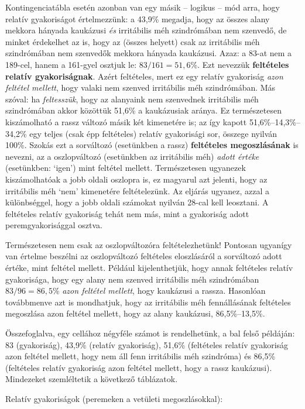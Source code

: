 \documentclass[
]{book}
\begin{document}
Kontingenciatábla esetén azonban van egy másik -- logikus -- mód arra, hogy relatív gyakoriságot értelmezzünk: a 43,9\% megadja, hogy az összes alany mekkora hányada kaukázusi \emph{és} irritábilis méh szindrómában nem szenvedő, de minket érdekelhet az is, hogy az (összes helyett) csak az irritábilis méh szindrómában nem szenvedők mekkora hányada kaukázusi. Azaz: a 83-at nem a 189-cel, hanem a 161-gyel osztjuk le: \(83/161=51,\!6\)\%. Ezt nevezzük \textbf{feltételes relatív gyakoriságnak}. Azért feltételes, mert ez egy relatív gyakoriság \emph{azon feltétel mellett}, hogy valaki nem szenved irritábilis méh szindrómában. Más szóval: ha \emph{feltesszük}, hogy az alanyaink nem szenvednek irritábilis méh szindrómában akkor közöttük 51,6\% a kaukázusiak aránya. Ez természetesen kiszámolható a rassz változó másik két kimenetére is; az így kapott 51,6\%--14,3\%--34,2\% egy teljes (csak épp feltételes) relatív gyakorisági sor, összege nyilván 100\%. Szokás ezt a sorváltozó (esetünkben a rassz) \textbf{feltételes megoszlásának} is nevezni, az a oszlopváltozó (esetünkben az irritábilis méh) \emph{adott értéke} (esetünkben: `igen') mint feltétel mellett. Természetesen ugyanezek kiszámolhatóak a jobb oldali oszlopra is, ez magyarul azt jelenti, hogy az irritábilis méh `nem' kimenetére feltételezünk. Az eljárás ugyanez, azzal a különbséggel, hogy a jobb oldali számokat nyilván 28-cal kell leosztani. A feltételes relatív gyakoriság tehát nem más, mint a gyakoriság adott peremgyakorisággal osztva.

Természetesen nem csak az oszlopváltozóra feltételezhetünk! Pontosan ugyanígy van értelme beszélni az oszlopváltozó feltételes eloszlásáról a sorváltozó adott értéke, mint feltétel mellett. Például kijelenthetjük, hogy annak feltételes relatív gyakorisága, hogy egy alany nem szenved irritábilis méh szindrómában \(83/96=86,\!5\)\% \emph{azon feltétel mellett}, hogy kaukázusi a rassza. Hasonlóan továbbmenve azt is mondhatjuk, hogy az irritábilis méh fennállásának feltételes megoszlása azon feltétel mellett, hogy az alany kaukázusi, 86,5\%--13,5\%.

Összefoglalva, egy cellához négyféle számot is rendelhetünk, a bal felső példáján: 83 (gyakoriság), 43,9\% (relatív gyakoriság), 51,6\% (feltételes relatív gyakoriság azon feltétel mellett, hogy nem áll fenn irritábilis méh szindróma) és 86,5\% (feltételes relatív gyakoriság azon feltétel mellett, hogy a rassz kaukázusi). Mindezeket szemléltetik a következő táblázatok.

Relatív gyakoriságok (peremeken a vetületi megoszlásokkal):
\end{document}
